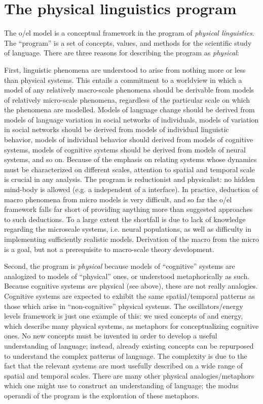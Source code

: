 \chapter{The physical linguistics program}

The o/el model is a conceptual framework in the program of \textit{physical linguistics}. The  “program” is a set of concepts, values, and methods for the scientific study of language. There are three reasons for describing the program as \textit{physical}: 

  First, linguistic phenomena are understood to arise from nothing more or less than physical systems. This entails a commitment to a worldview in which a model of any relatively macro-scale phenomena should be derivable from models of relatively micro-scale phenomena, regardless of the particular scale on which the phenomena are modelled. Models of language change should be derived from models of language variation in social networks of individuals, models of variation in social networks should be derived from models of individual linguistic behavior, models of individual behavior should derived from models of cognitive systems, models of cognitive systems should be derived from models of neural systems, and so on. Because of the emphasis on relating systems whose dynamics must be characterized on different scales, attention to spatial and temporal scale is crucial in any analysis. The program is reductionist and physicalist: no hidden mind-body  is allowed (e.g. a  independent of a  interface). In practice, deduction of macro phenomena from micro models is very difficult, and so far the o/el framework falls far short of providing anything more than suggested approaches to such deductions. To a large extent the shortfall is due to lack of knowledge regarding the microscale systems, i.e. neural populations, as well as difficulty in implementing sufficiently realistic models. Derivation of the macro from the micro is a goal, but not a prerequisite to macro-scale theory development.

  Second, the program is \textit{physical} because models of “cognitive” systems are analogized to models of “physical” ones, or understood metaphorically as such. Because cognitive systems \textit{are} physical (see above), these are not really analogies. Cognitive systems are expected to exhibit the same spatial/temporal patterns as those which arise in “non-cognitive” physical systems. The oscillators/energy levels framework is just one example of this: we used concepts of  and energy, which describe many physical systems, as metaphors for conceptualizing cognitive ones. No new concepts must be invented in order to develop a useful understanding of language; instead, already existing concepts can be repurposed to understand the complex patterns of language. The complexity is due to the fact that the relevant systems are most usefully described on a wide range of spatial and temporal scales. There are many other physical analogies/metaphors which one might use to construct an understanding of language; the modus operandi of the program is the exploration of these metaphors.

